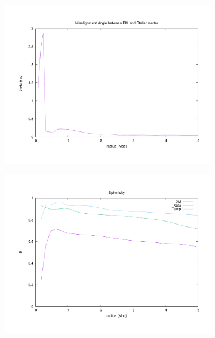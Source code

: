 \documentclass[journal]{IEEEtran}
\begin{document}
\begin{figure}[t!]
\centering
	\begin{subfigure}[t]{0.45\textwidth}
		\centering
		\includegraphics[width=\linewidth]{GasDMAlign}
	\end{subfigure}
	\quad
	\begin{subfigure}[t]{0.45\textwidth}
		\centering
		\includegraphics[width=\linewidth]{Sphericity}
	\end{subfigure}
	\\
	\begin{subfigure}[t]{0.45\textwidth}
		\centering

\end{subfigure}
\end{figure}
\end{document}
